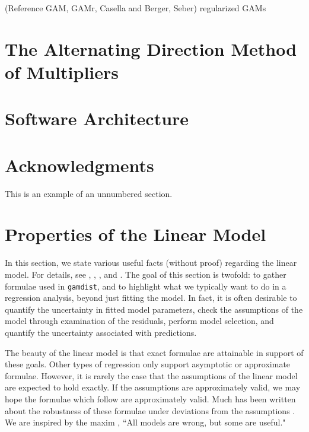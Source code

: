 \documentclass[12pt]{article}
\begin{document}
(Reference GAM, GAMr, Casella and Berger, Seber) regularized GAMs 

\section{The Alternating Direction Method of Multipliers}
\label{sec:admm}

\section{Software Architecture}
\label{sec:arch}

\section*{Acknowledgments}

This is an example of an unnumbered section.

\appendix

\section{Properties of the Linear Model}
\label{app:linear_model}

In this section, we state various useful facts (without proof) regarding the linear model. For details, see \cite{Weisberg:2005}, \cite{Seber:2003}, \cite{Wood:2017}, and \cite{CB:2001}. The goal of this section is twofold: to gather formulae used in \texttt{gamdist}, and to highlight what we typically want to do in a regression analysis, beyond just fitting the model. In fact, it is often desirable to quantify the uncertainty in fitted model parameters, check the assumptions of the model through examination of the residuals, perform model selection, and quantify the uncertainty associated with predictions.

The beauty of the linear model is that exact formulae are attainable in support of these goals. Other types of regression only support asymptotic or approximate formulae. However, it is rarely the case that the assumptions of the linear model are expected to hold exactly. If the assumptions are approximately valid, we may hope the formulae which follow are approximately valid. Much has been written about the robustness of these formulae under deviations from the assumptions \cite[\S 9]{Seber:2003}. We are inspired by the maxim \cite{Box:1987}, ``All models are wrong, but some are useful."
\end{document}
